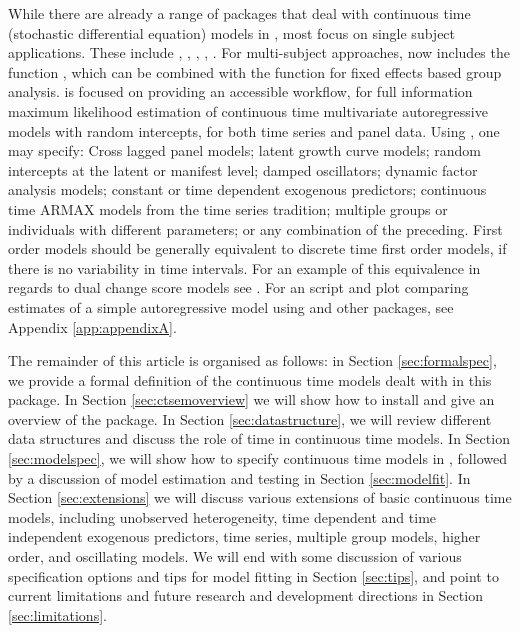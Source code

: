 \documentclass[nojss]{jss}\usepackage[]{graphicx}\usepackage[]{color}
\begin{document}
While there are already a range of packages that deal with continuous time (stochastic differential equation) models in , most focus on single subject applications. These include  \citep{iacus2015pkgsde},  \citep{brouste2014pkgyuima},  \citep{boukhetala2014pkgsim},  \citep{wang2013pkgcts},  \citep{king2010pkgpomp}. For multi-subject approaches,  \citep{neale2015openmx} now includes the function , which can be combined with the function  for fixed effects based group analysis.   is focused on providing an accessible workflow, for full information maximum likelihood estimation of continuous time multivariate autoregressive models with random intercepts,  for both time series and panel data. Using , one may specify: Cross lagged panel models; latent growth curve models; random intercepts at the latent or manifest level; damped oscillators; dynamic factor analysis models; constant or time dependent exogenous predictors; continuous time ARMAX models from the time series tradition; multiple groups or individuals with different parameters; or any combination of the preceding. First order models should be generally equivalent to discrete time first order models, if there is no variability in time intervals. For an example of this equivalence in regards to dual change score models see \citet{voelkle2015relating}. For an  script and plot comparing estimates of a simple autoregressive model using  and other packages, see Appendix \ref{app:appendixA}.


The remainder of this article is organised as follows: in Section \ref{sec:formalspec}, we provide a formal definition of the continuous time models dealt with in this package. In Section \ref{sec:ctsemoverview} we will show how to install  and give an overview of the package. In Section \ref{sec:datastructure}, we will review different data structures and discuss the role of time in continuous time models. In Section \ref{sec:modelspec}, we will show how to specify continuous time models in , followed by a discussion of model estimation and testing in Section \ref{sec:modelfit}. In Section \ref{sec:extensions} we will discuss various extensions of basic continuous time models, including unobserved heterogeneity, time dependent and time independent exogenous predictors, time series, multiple group models, higher order, and oscillating models. We will end with some discussion of various specification options and tips for model fitting in Section \ref{sec:tips}, and point to current limitations and future research and development directions in Section \ref{sec:limitations}.
\end{document}
